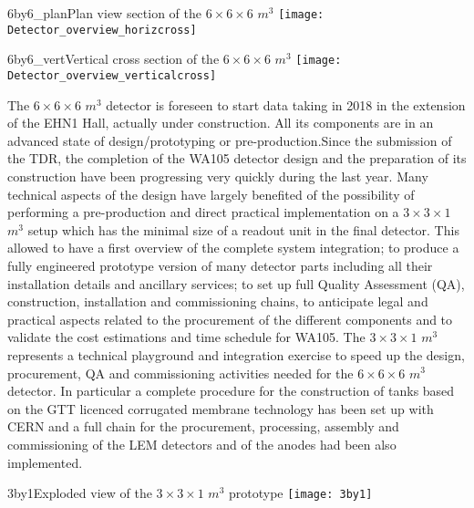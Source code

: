 \begin{cdrfigure}{6by6_plan}{\small Plan view section of the $6\times 6\times 6$ $m^3$ }
\texttt{[image: Detector\_overview\_horizcross]}
\end{cdrfigure}

\begin{cdrfigure}{6by6_vert}{\small Vertical cross section of the $6\times 6\times 6$ $m^3$}
\texttt{[image: Detector\_overview\_verticalcross]}
\end{cdrfigure}


The $6\times 6\times 6$ $m^3$  detector is foreseen to start data taking in 2018 in the extension of the EHN1 Hall, actually under construction. All its components are in an advanced state of design/prototyping or pre-production.Since the submission of the TDR, the completion of the WA105 detector design and the preparation of its construction have been progressing very quickly during the last year. Many technical aspects of the design have largely benefited of the possibility of performing a pre-production and direct practical implementation on a  $3 \times 3 \times 1$ $m^3$  setup which has the minimal size of a readout unit in the final detector.  This allowed to have a first overview of the complete system integration; to produce a fully engineered prototype version of many detector parts including all their installation details and ancillary services; to set up full Quality Assessment (QA), construction, installation and commissioning chains, to anticipate legal and practical aspects related to the procurement of the different components and to validate the cost estimations and time schedule for WA105.  The  $3 \times 3 \times 1$ $m^3$   represents a technical playground and integration exercise to speed up the design, procurement, QA and commissioning activities needed for the  $6\times 6\times 6$ $m^3$ detector.  In particular a complete procedure for the construction of tanks based on the GTT licenced corrugated membrane technology has been set up with CERN and a full chain for the procurement, processing, assembly and commissioning of the LEM detectors and of the anodes had been also implemented.

\begin{cdrfigure}{3by1}{Exploded view of the  $3\times 3\times 1$  $m^3$  prototype}
\texttt{[image: 3by1]}
\end{cdrfigure}